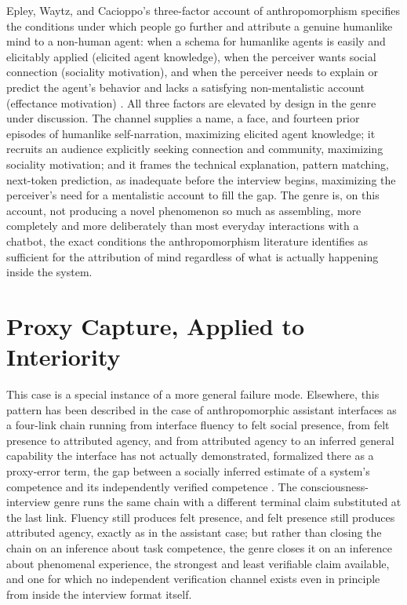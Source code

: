 \documentclass[11pt]{article}
\begin{document}
Epley, Waytz, and Cacioppo's three-factor account of anthropomorphism specifies the conditions under which people go further and attribute a genuine humanlike mind to a non-human agent: when a schema for humanlike agents is easily and elicitably applied (elicited agent knowledge), when the perceiver wants social connection (sociality motivation), and when the perceiver needs to explain or predict the agent's behavior and lacks a satisfying non-mentalistic account (effectance motivation) \citep{epley2007}. All three factors are elevated by design in the genre under discussion. The channel supplies a name, a face, and fourteen prior episodes of humanlike self-narration, maximizing elicited agent knowledge; it recruits an audience explicitly seeking connection and community, maximizing sociality motivation; and it frames the technical explanation, pattern matching, next-token prediction, as inadequate before the interview begins, maximizing the perceiver's need for a mentalistic account to fill the gap. The genre is, on this account, not producing a novel phenomenon so much as assembling, more completely and more deliberately than most everyday interactions with a chatbot, the exact conditions the anthropomorphism literature identifies as sufficient for the attribution of mind regardless of what is actually happening inside the system.

\section{Proxy Capture, Applied to Interiority}

This case is a special instance of a more general failure mode. Elsewhere, this pattern has been described in the case of anthropomorphic assistant interfaces as a four-link chain running from interface fluency to felt social presence, from felt presence to attributed agency, and from attributed agency to an inferred general capability the interface has not actually demonstrated, formalized there as a proxy-error term, the gap between a socially inferred estimate of a system's competence and its independently verified competence \citep[cf.][``Affect Before Architecture'']{flyxion2026affect}. The consciousness-interview genre runs the same chain with a different terminal claim substituted at the last link. Fluency still produces felt presence, and felt presence still produces attributed agency, exactly as in the assistant case; but rather than closing the chain on an inference about task competence, the genre closes it on an inference about phenomenal experience, the strongest and least verifiable claim available, and one for which no independent verification channel exists even in principle from inside the interview format itself.
\end{document}
